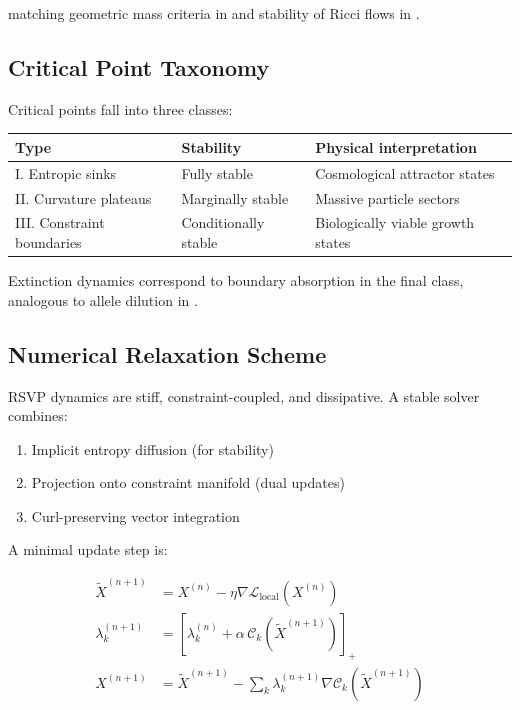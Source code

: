 \documentclass[11pt,a4paper]{article}
\begin{document}
matching geometric mass criteria in \citet{Pincak2025} and stability of Ricci flows in \citet{Perelman2002}.

\subsection{Critical Point Taxonomy}

Critical points fall into three classes:

\begin{center}
\begin{tabular}{lll}
\toprule
Type & Stability & Physical interpretation \\
\midrule
I. Entropic sinks & Fully stable & Cosmological attractor states \\
II. Curvature plateaus & Marginally stable & Massive particle sectors \\
III. Constraint boundaries & Conditionally stable & Biologically viable growth states \\
\bottomrule
\end{tabular}
\end{center}

Extinction dynamics correspond to boundary absorption in the final class, analogous to allele dilution in \citet{Amadei2025}.

\subsection{Numerical Relaxation Scheme}

RSVP dynamics are stiff, constraint-coupled, and dissipative. A stable solver combines:

\begin{enumerate}
    \item Implicit entropy diffusion (for stability)
    \item Projection onto constraint manifold (dual updates)
    \item Curl-preserving vector integration
\end{enumerate}

A minimal update step is:

\begin{align}
\tilde{X}^{(n+1)} &= X^{(n)} - \eta \nabla \mathcal{L}_{\text{local}}(X^{(n)}) \\
\lambda_k^{(n+1)} &= \left[ \lambda_k^{(n)} + \alpha \, \mathcal{C}_k(\tilde{X}^{(n+1)}) \right]_+ \\
X^{(n+1)} &= \tilde{X}^{(n+1)} - \sum_k \lambda_k^{(n+1)} \nabla \mathcal{C}_k(\tilde{X}^{(n+1)})
\end{align}
\end{document}
